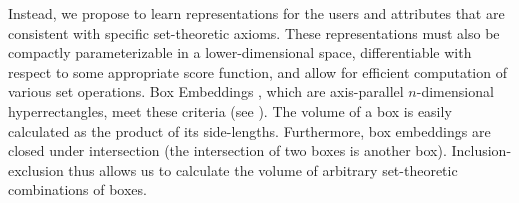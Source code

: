 

Instead, we propose to learn representations for the users and attributes that are consistent with specific set-theoretic axioms. These representations must also be compactly parameterizable in a lower-dimensional space, differentiable with respect to some appropriate score function, and allow for efficient computation of various set operations.
Box Embeddings \citep{hard_box, gumbel_box}, which are axis-parallel $n$-dimensional hyperrectangles, meet these criteria (see ).
The volume of a box is easily calculated as the product of its side-lengths. Furthermore, box embeddings are closed under intersection (\ie the intersection of two boxes is another box). Inclusion-exclusion thus allows us to calculate the volume of arbitrary set-theoretic combinations of boxes.


